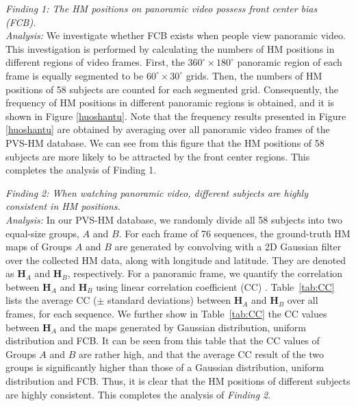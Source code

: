 \documentclass[10pt,journal,compsoc]{IEEEtran}
\begin{document}
\emph{Finding 1:  The HM positions on panoramic video possess front center bias (FCB). }
\\ \textit{Analysis:} We investigate whether FCB exists when people view panoramic video. This investigation is performed by calculating the numbers of HM positions in different regions of video frames. First, the $360^{\circ} \times 180^{\circ}$ panoramic region of each frame is equally segmented to be $60^{\circ} \times 30^{\circ}$ grids. Then, the numbers of HM positions of 58 subjects are counted for each segmented grid. Consequently, the frequency of HM positions in different panoramic regions is obtained, and it is shown in Figure \ref{huoshantu}. Note that the frequency results presented in Figure \ref{huoshantu} are obtained by averaging over all panoramic video frames of the PVS-HM database. We can see from this figure that the HM positions of 58 subjects are more likely to be attracted by the front center regions. This completes the analysis of Finding 1.

\emph{Finding 2: When watching panoramic video, different subjects are highly consistent in HM positions.}
\\ \textit{Analysis:} In our PVS-HM database, we randomly divide all 58 subjects into two equal-size groups, $A$ and $B$.
For each frame of 76 sequences, the ground-truth HM maps of Groups $A$ and $B$ are generated by convolving with a 2D Gaussian filter over the collected HM data, along with longitude and latitude.
They are denoted as $\mathbf{H}_A$ and $\mathbf{H}_B$, respectively.
For a panoramic frame, we quantify the correlation between $\mathbf{H}_A$ and $\mathbf{H}_B$ using linear correlation coefficient (CC) \cite{li2015data}.
Table~\ref{tab:CC} lists the average CC ($\pm$ standard deviations) between $\mathbf{H}_A$ and $\mathbf{H}_B$ over all frames, for each sequence.
We further show in  Table~\ref{tab:CC} the CC values between $\mathbf{H}_A$ and the maps generated by Gaussian distribution, uniform distribution and FCB.
It can be seen from this table that the CC values of Groups $A$ and $B$ are rather high, and that the average CC result of the two groups is significantly higher than those of a Gaussian distribution, uniform distribution and FCB.
Thus, it is clear that the HM positions of different subjects are highly consistent.
This completes the analysis of \textit{Finding 2}.
\end{document}
